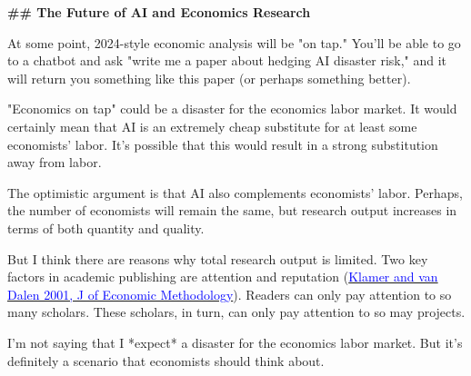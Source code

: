 \begin{mdframed}[linewidth=1pt, linecolor=black]
\textbf{\textcolor{red!70!black}{\#\# The Future of AI and Economics Research}}

At some point, 2024-style economic analysis will be "on tap." You'll be able to go to a chatbot and ask "write me a paper about hedging AI disaster risk," and it will return you something like this paper (or perhaps something better). 

"Economics on tap" could be a disaster for the economics labor market. It would certainly mean that AI is an extremely cheap substitute for at least some economists' labor. It's possible that this would result in a strong substitution away from labor.

The optimistic argument is that AI also complements economists' labor. Perhaps, the number of economists will remain the same, but research output increases in terms of both quantity and quality. 

But I think there are reasons why total research output is limited. Two key factors in academic publishing are attention and reputation (\href{https://repub.eur.nl/pub/6875/2001-0221.pdf}{\textcolor{blue}{Klamer and van Dalen 2001, J of Economic Methodology}}). Readers can only pay attention to so many scholars. These scholars, in turn, can only pay attention to so may projects. 

I'm not saying that I *expect* a disaster for the economics labor market. But it's definitely a scenario that economists should think about. 
\endgroup
\end{mdframed}
\vspace{-3ex}